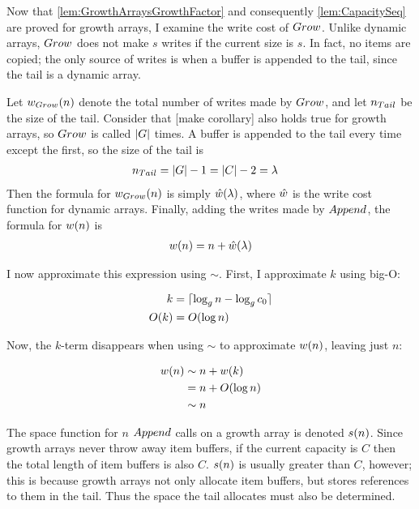 Now that \ref{lem:GrowthArraysGrowthFactor} and consequently \ref{lem:CapacitySeq} are proved for growth arrays, I examine the write cost of $Grow$. Unlike dynamic arrays, $Grow$ does not make $s$ writes if the current size is $s$. In fact, no items are copied; the only source of writes is when a buffer is appended to the tail, since the tail is a dynamic array.

Let ${w}_{Grow}(n)$ denote the total number of writes made by $Grow$, and let $n_{Tail}$ be the size of the tail. Consider that [make corollary] also holds true for growth arrays, so $Grow$ is called $|G|$ times. A buffer is appended to the tail every time except the first, so the size of the tail is
\begin{align*}
n_{Tail} &= |G| - 1 = |C| - 2 = \lambda
\end{align*}
Then the formula for ${w}_{Grow}(n)$ is simply $\hat{w}(\lambda)$, where $\hat{w}$ is the write cost function for dynamic arrays. Finally, adding the writes made by $Append$, the formula for $w(n)$ is
\begin{align*}
w(n) = n + \hat{w}(\lambda)
\end{align*}


I now approximate this expression using $\sim$. First, I approximate $k$ using big-O:

\begin{align*}
k &= \lceil \log_{g} n - \log_{g} c_0 \rceil\\
O(k) &= O(\log n)
\end{align*}

Now, the $k$-term disappears when using $\sim$ to approximate $w(n)$, leaving just $n$:

\begin{align*}
w(n) &\sim n + w(k)\\
&= n + O(\log n)\\
&\sim n
\end{align*}

\HdrSpaceComplex

The space function for $n$ $Append$ calls on a growth array is denoted $s(n)$. Since growth arrays never throw away item buffers, if the current capacity is $C$ then the total length of item buffers is also $C$. $s(n)$ is usually greater than $C$, however; this is because growth arrays not only allocate item buffers, but stores references to them in the tail. Thus the space the tail allocates must also be determined.

